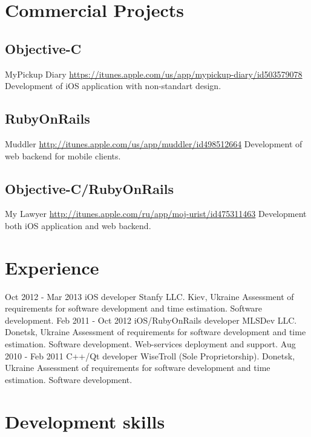 \documentclass[11pt,a4paper]{moderncv}
\begin{document}
\section{Commercial Projects}
  \subsection{Objective-C}
  \cvline
    {MyPickup Diary}
    {\url{https://itunes.apple.com/us/app/mypickup-diary/id503579078}\newline{}
    Development of iOS application with non-standart design.}
  \subsection{RubyOnRails}
  \cvline
    {Muddler}
    {\url{http://itunes.apple.com/us/app/muddler/id498512664}\newline{}
    Development of web backend for mobile clients.}
  \subsection{Objective-C/RubyOnRails}
  \cvline
    {My Lawyer}
    {\url{http://itunes.apple.com/ru/app/moj-urist/id475311463}\newline{}
    Development both iOS application and web backend.}

\section{Experience}
\cventry
  {Oct 2012 - Mar 2013}
  {iOS developer}
  {Stanfy LLC. Kiev, Ukraine}
  {}{}
  {Assessment of requirements for software development and time estimation. 
  \newline{}Software development.}
\cventry
  {Feb 2011 - Oct 2012}
  {iOS/RubyOnRails developer}
  {MLSDev LLC. Donetsk, Ukraine}
  {}{}
  {Assessment of requirements for software development and time estimation. 
  \newline{}Software development.
  \newline{}Web-services deployment and support.}
\cventry
  {Aug 2010 - Feb 2011}
  {C++/Qt developer}
  {WiseTroll (Sole Proprietorship). Donetsk, Ukraine}
  {}{}
  {Assessment of requirements for software development and time estimation. 
  \newline{}Software development.}


\section{Development skills}
\end{document}
